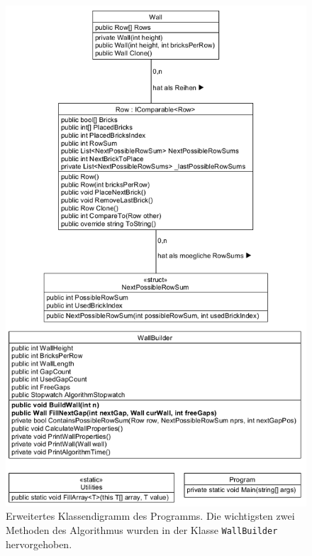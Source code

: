 \documentclass[a4paper,12pt]{article}
\newcommand{\code}{\texttt}
\begin{document}
\begin{figure}[H]
    \centering
    \includegraphics[width=.925\linewidth]{Bilder/Aufgabe1/Klassendiagramm.png}
    \caption{Erweitertes Klassendigramm des Programms. Die wichtigsten zwei Methoden des Algorithmus wurden in der Klasse \code{WallBuilder} hervorgehoben.}
\end{figure}
\end{document}
